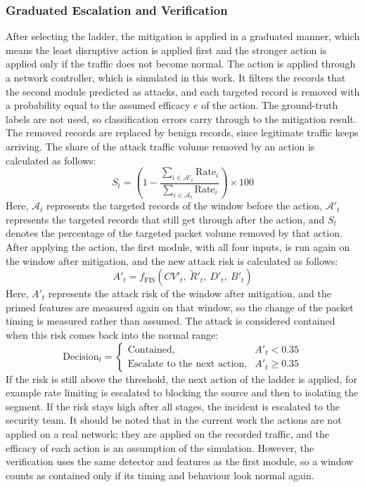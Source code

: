 \documentclass[]{interact}
\theoremstyle{plain}%
\theoremstyle{definition}
\theoremstyle{remark}
\begin{document}
\subsubsection{Graduated Escalation and Verification}
After selecting the ladder, the mitigation is applied in a graduated manner, which means the least disruptive action is applied first and the stronger action is applied only if the traffic does not become normal. The action is applied through a network controller, which is simulated in this work. It filters the records that the second module predicted as attacks, and each targeted record is removed with a probability equal to the assumed efficacy $e$ of the action. The ground-truth labels are not used, so classification errors carry through to the mitigation result. The removed records are replaced by benign records, since legitimate traffic keeps arriving. The share of the attack traffic volume removed by an action is calculated as follows:
\begin{equation}
  S_t = \left(1 - \frac{\sum_{i \in \mathcal{A}'_t} \mathrm{Rate}_i}{\sum_{i \in \mathcal{A}_t} \mathrm{Rate}_i}\right) \times 100
\end{equation}
Here, $\mathcal{A}_t$ represents the targeted records of the window before the action, $\mathcal{A}'_t$ represents the targeted records that still get through after the action, and $S_t$ denotes the percentage of the targeted packet volume removed by that action. After applying the action, the first module, with all four inputs, is run again on the window after mitigation, and the new attack risk is calculated as follows:
\begin{equation}
  A'_t = f_{\mathrm{FIS}}\left(CV'_t,\ \tilde{R}'_t,\ D'_t,\ B'_t\right)
\end{equation}
Here, $A'_t$ represents the attack risk of the window after mitigation, and the primed features are measured again on that window, so the change of the packet timing is measured rather than assumed. The attack is considered contained when this risk comes back into the normal range:
\begin{equation}
  \text{Decision}_t =
  \begin{cases}
    \text{Contained}, & A'_t < 0.35\\
    \text{Escalate to the next action}, & A'_t \ge 0.35
  \end{cases}
\end{equation}
If the risk is still above the threshold, the next action of the ladder is applied, for example rate limiting is escalated to blocking the source and then to isolating the segment. If the risk stays high after all stages, the incident is escalated to the security team. It should be noted that in the current work the actions are not applied on a real network; they are applied on the recorded traffic, and the efficacy of each action is an assumption of the simulation. However, the verification uses the same detector and features as the first module, so a window counts as contained only if its timing and behaviour look normal again.
\end{document}
